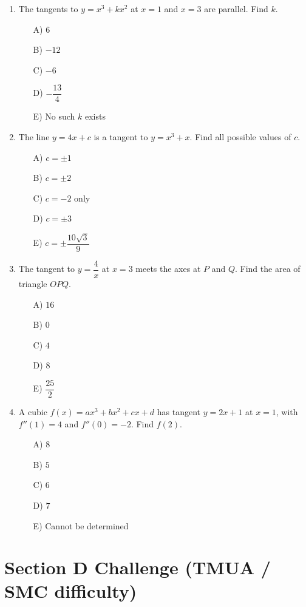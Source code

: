 \documentclass[11pt,a4paper]{article}
\begin{document}
\begin{enumerate}
\item The tangents to $y=x^3+kx^2$ at $x=1$ and $x=3$ are parallel. Find $k$.
\begin{itemize}
\item[A)] $6$
\item[B)] $-12$
\item[C)] $-6$
\item[D)] $-\dfrac{13}{4}$
\item[E)] No such $k$ exists
\end{itemize}

\item The line $y=4x+c$ is a tangent to $y=x^3+x$. Find all possible values of $c$.
\begin{itemize}
\item[A)] $c=\pm 1$
\item[B)] $c=\pm 2$
\item[C)] $c=-2$ only
\item[D)] $c=\pm 3$
\item[E)] $c=\pm\dfrac{10\sqrt{3}}{9}$
\end{itemize}

\item The tangent to $y=\dfrac{4}{x}$ at $x=3$ meets the axes at $P$ and $Q$. Find the area of triangle $OPQ$.
\begin{itemize}
\item[A)] $16$
\item[B)] $0$
\item[C)] $4$
\item[D)] $8$
\item[E)] $\dfrac{25}{2}$
\end{itemize}

\item A cubic $f(x)=ax^3+bx^2+cx+d$ has tangent $y=2x+1$ at $x=1$, with $f''(1)=4$ and $f''(0)=-2$. Find $f(2)$.
\begin{itemize}
\item[A)] $8$
\item[B)] $5$
\item[C)] $6$
\item[D)] $7$
\item[E)] Cannot be determined
\end{itemize}

\end{enumerate}

\section*{Section D \quad Challenge \hfill{\normalfont\small(TMUA / SMC difficulty)}}
\end{document}
